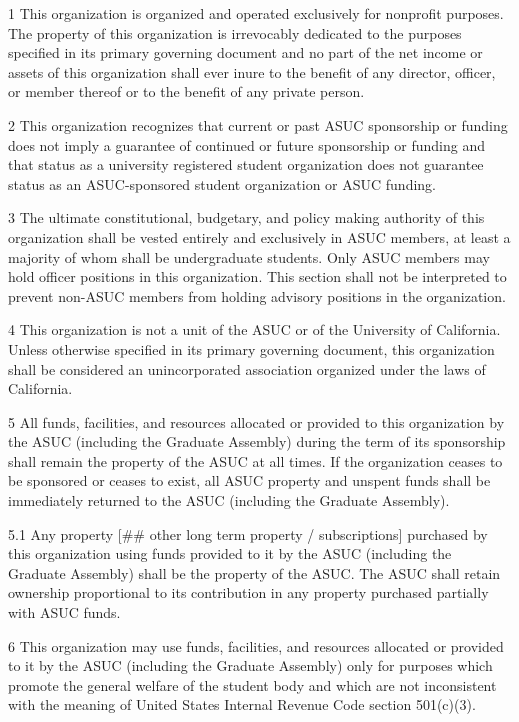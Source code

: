 \documentclass[11pt]{article}
\begin{document}
1 This organization is organized and operated exclusively for nonprofit purposes.
The property of this organization is irrevocably dedicated to the purposes specified in its primary governing document and no part of the net income or assets of this organization shall ever inure to the benefit of any director, officer, or member thereof or to the benefit of any private person.

2 This organization recognizes that current or past ASUC sponsorship or funding does not imply a guarantee of continued or future sponsorship or funding and that status as a university registered student organization does not guarantee status as an ASUC-sponsored student organization or ASUC funding.

3 The ultimate constitutional, budgetary, and policy making authority of this organization shall be vested entirely and exclusively in ASUC members, at least a majority of whom shall be undergraduate students.
Only ASUC members may hold officer positions in this organization.
This section shall not be interpreted to prevent non-ASUC members from holding advisory positions in the organization.

4 This organization is not a unit of the ASUC or of the University of California.
Unless otherwise specified in its primary governing document, this organization shall be considered an unincorporated association organized under the laws of California.

5 All funds, facilities, and resources allocated or provided to this organization by the ASUC (including the Graduate Assembly) during the term of its sponsorship shall remain the property of the ASUC at all times.
If the organization ceases to be sponsored or ceases to exist, all ASUC property and unspent funds shall be immediately returned to the ASUC (including the Graduate Assembly).

5.1 Any property [\#\# other long term property / subscriptions] purchased by this organization using funds provided to it by the ASUC (including the Graduate Assembly) shall be the property of the ASUC.
The ASUC shall retain ownership proportional to its contribution in any property purchased partially with ASUC funds.

6 This organization may use funds, facilities, and resources allocated or provided to it by the ASUC (including the Graduate Assembly) only for purposes which promote the general welfare of the student body and which are not inconsistent with the meaning of United States Internal Revenue Code section 501(c)(3).
\end{document}
